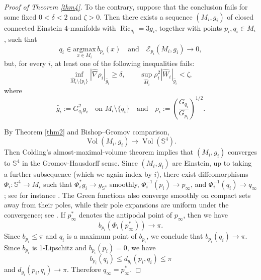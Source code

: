 \documentclass[11pt]{amsart}
\theoremstyle{plain}
\numberwithin{equation}{section}
\renewcommand{\S}{\mathbb{S}}
\newcommand{\E}{\mathcal{E}}
\DeclareMathOperator{\ric}{Ric}
\DeclareMathOperator{\vol}{Vol}
\newcommand{\hn}{\widehat{\nabla}}
\newcommand{\hg}{\widehat{g}}
\newcommand{\hw}{\widehat{W}}
\newcommand{\hm}{\widehat{M}}
\begin{document}
\begin{proof}[Proof of Theorem \ref{thm4}]
To the contrary, suppose that the conclusion fails for some fixed $0<\delta<2$ and $\zeta>0$. Then there exists a sequence $(M_i,g_i)$ of closed connected Einstein 4-manifolds with $\ric_{g_i}=3g_i$, together with points $p_i,q_i\in M_i$, such that
\begin{equation*}
q_i\in\underset{x\in M_i}{\mathrm{argmax}}\,b_{p_i}(x)\quad\text{and}\quad \E_{p_i}(M_i,g_i)\rightarrow0,
\end{equation*}
but, for every $i$, at least one of the following inequalities fails: 
\begin{equation}\label{eq:thm1.4.1}
\inf_{\hm_i\setminus\{p_i\}}|\hn\rho_{i}|_{\hg_i}\ge\delta,\qquad \sup_{\hm_i}\rho_i^2|\hw_i|_{\hg_i}<\zeta,
\end{equation}
where
\begin{equation*}
\hg_i:=G_{q_i}^2 g_i\quad\text{on $M_i\setminus\{q_i\}$}\quad\text{and}\quad \rho_i:=\left(\frac{G_{q_i}}{G_{p_i}}\right)^{1/2}.
\end{equation*}

By Theorem \ref{thm2} and Bishop--Gromov comparison,
\begin{equation*}
\vol(M_i,g_i)\rightarrow\vol(\S^4).
\end{equation*}
Then Colding's almost-maximal-volume theorem \cite{Colding1996Shape} implies that $(M_i,g_i)$ converges to $\S^4$ in the Gromov-Hausdorff sense. Since $(M_i,g_i)$ are Einstein, up to taking a further subsequence (which we again index by $i$), there exist diffeomorphisms $\Phi_i:\S^4\rightarrow M_i$ such that $\Phi_i^\ast g_i\rightarrow g_{\S^4}$ smoothly, $\Phi_i^{-1}(p_i)\rightarrow p_\infty$, and $\Phi_i^{-1}(q_i)\rightarrow q_\infty$; see for instance \cite{Anderson1990}. The Green functions also converge smoothly on compact sets away from their poles, while their pole expansions are uniform under the convergence; see \cite{LeeParker1987}. If $p_\infty^\ast$ denotes the antipodal point of $p_\infty$, then we have
\begin{equation*}
b_{p_i}(\Phi_i(p_\infty^\ast))\rightarrow\pi.
\end{equation*}
Since $b_{p_i}\le\pi$ and $q_i$ is a maximum point of $b_{p_i}$, we conclude that $b_{p_i}(q_i)\rightarrow\pi$. Since $b_{p_i}$ is 1-Lipschitz and $b_{p_i}(p_i)=0$, we have
\begin{equation*}
b_{p_i}(q_i)\le d_{g_i}(p_i,q_i)\le\pi
\end{equation*}
and $d_{g_i}(p_i,q_i)\rightarrow\pi$. Therefore $q_\infty=p_\infty^\ast$. 


\end{proof}
\end{document}

